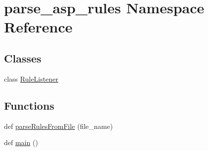 \hypertarget{namespaceparse__asp__rules}{}\section{parse\+\_\+asp\+\_\+rules Namespace Reference}
\label{namespaceparse__asp__rules}
\subsection*{Classes}
\begin{DoxyCompactItemize}
\item 
class \hyperlink{classparse__asp__rules_1_1_rule_listener}{Rule\+Listener}
\end{DoxyCompactItemize}
\subsection*{Functions}
\begin{DoxyCompactItemize}
\item 
def \hyperlink{namespaceparse__asp__rules_a1078844be7f2009c8ec09b66f660070e}{parse\+Rules\+From\+File} (file\+\_\+name)
\item 
def \hyperlink{namespaceparse__asp__rules_a5deac66595588966e7f7480630f15f27}{main} ()
\end{DoxyCompactItemize}
